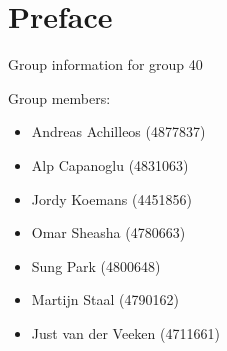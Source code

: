 \chapter*{Preface}\label{ch:preface}

Group information for group 40

Group members:
\begin{itemize}
    \item Andreas Achilleos (4877837)
    \item Alp Capanoglu (4831063)
    \item Jordy Koemans (4451856)
    \item Omar Sheasha (4780663)
    \item Sung Park (4800648)
    \item Martijn Staal (4790162)
    \item Just van der Veeken (4711661)
\end{itemize}

